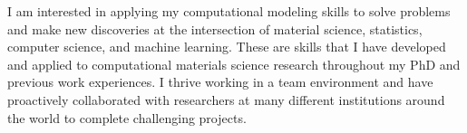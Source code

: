 

\begin{cvparagraph}

I am interested in applying my computational modeling skills to solve problems and make new discoveries at the intersection of material science, statistics, computer science, and machine learning. These are skills that I have developed and applied to computational materials science research throughout my PhD and previous work experiences. I thrive working in a team environment and have proactively collaborated with researchers at many different institutions around the world to complete challenging projects.
\end{cvparagraph}
